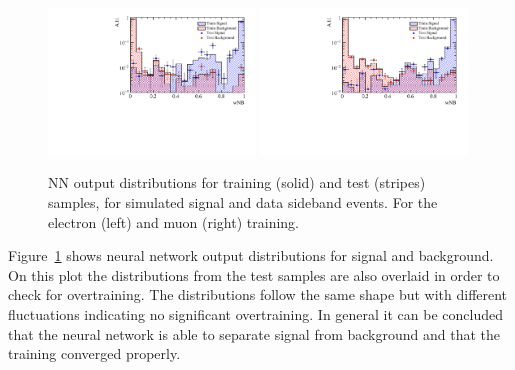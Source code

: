 %
\begin{figure}
\centering
\includegraphics[width=0.49\textwidth]{RKst/figs/Training/EE_wNB_TrainAndTest.pdf}
\includegraphics[width=0.49\textwidth]{RKst/figs/Training/MM_wNB_TrainAndTest.pdf}
\caption{NN output distributions for training (solid) and test (stripes) samples, for simulated 
signal and data sideband events. For the electron (left) and muon (right) training.}
\label{fig:RKst_nnDist}
\end{figure}

Figure~\ref{fig:RKst_nnDist} shows neural network output distributions for signal and background.
On this plot the distributions from the test samples are also overlaid in order to check for overtraining. 
The distributions follow the same shape but with different fluctuations indicating no
significant overtraining. In general it can be concluded that the neural network is able to separate signal
from background and that the training converged properly.

